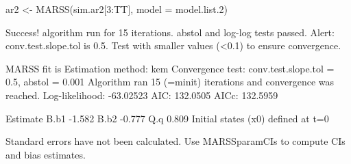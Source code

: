 \begin{Schunk}
\begin{Sinput}
 ar2 <- MARSS(sim.ar2[3:TT], model = model.list.2)
\end{Sinput}
\begin{Soutput}
Success! algorithm run for 15 iterations. abstol and log-log tests passed.
Alert: conv.test.slope.tol is 0.5.
Test with smaller values (<0.1) to ensure convergence.

MARSS fit is
Estimation method: kem 
Convergence test: conv.test.slope.tol = 0.5, abstol = 0.001
Algorithm ran 15 (=minit) iterations and convergence was reached. 
Log-likelihood: -63.02523 
AIC: 132.0505   AICc: 132.5959   
 
     Estimate
B.b1   -1.582
B.b2   -0.777
Q.q     0.809
Initial states (x0) defined at t=0

Standard errors have not been calculated. 
Use MARSSparamCIs to compute CIs and bias estimates.
\end{Soutput}
\end{Schunk}
